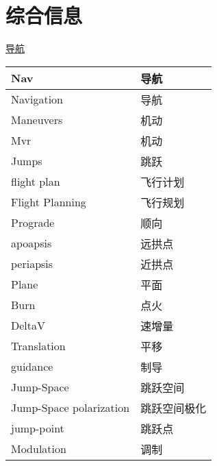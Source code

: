 \documentclass[a4paper]{article}
\theoremstyle{definition}
\begin{document}
		

\newpage

\pagestyle{fancy}
\setcounter{page}{1}

\renewcommand*\contentsname{目录}
\tableofcontents
\newpage



\section*{综合信息}
 
\vspace{10pt}
{\large{\uline{导航}}}
{\small{
\begin{longtable}{|p{4.5cm}|p{10cm}|}
	\hline
	Nav                             & 导航      \\ \hline
	Navigation                      & 导航      \\ \hline
	Maneuvers                       & 机动      \\ \hline
	Mvr                             & 机动      \\ \hline
	Jumps                           & 跳跃      \\ \hline
	flight plan                     & 飞行计划    \\ \hline
	Flight Planning                 & 飞行规划    \\ \hline
	Prograde                        & 顺向      \\ \hline
	apoapsis                        & 远拱点     \\ \hline
	periapsis                       & 近拱点     \\ \hline
	Plane                           & 平面      \\ \hline
	Burn                            & 点火      \\ \hline
	DeltaV                          & 速增量     \\ \hline
	Translation                     & 平移      \\ \hline
	guidance                        & 制导      \\ \hline
	Jump-Space                      & 跳跃空间    \\ \hline
	Jump-Space polarization         & 跳跃空间极化  \\ \hline
	jump-point                      & 跳跃点     \\ \hline
	Modulation                      & 调制      \\ \hline

\end{longtable}}}
\end{document}
